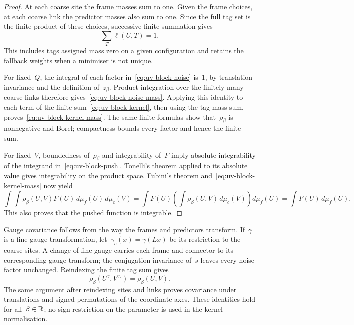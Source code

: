 \begin{proof}
At each coarse site the frame masses sum to one. Given the frame choices, at each coarse link the predictor masses also sum to one. Since the full tag set is the finite product of these choices, successive finite summation gives
\begin{equation*}
 \sum_T\ell(U,T)=1.
\end{equation*}
This includes tags assigned mass zero on a given configuration and retains the fallback weights when a minimiser is not unique.

For fixed~$Q$, the integral of each factor in~\eqref{eq:uv-block-noise} is~$1$, by translation invariance and the definition of~$z_\beta$. Product integration over the finitely many coarse links therefore gives~\eqref{eq:uv-block-noise-mass}. Applying this identity to each term of the finite sum~\eqref{eq:uv-block-kernel}, then using the tag-mass sum, proves~\eqref{eq:uv-block-kernel-mass}. The same finite formulas show that~$\rho_\beta$ is nonnegative and Borel; compactness bounds every factor and hence the finite sum.

For fixed~$V$, boundedness of~$\rho_\beta$ and integrability of~$F$ imply absolute integrability of the integrand in~\eqref{eq:uv-block-push}. Tonelli's theorem applied to its absolute value gives integrability on the product space. Fubini's theorem and~\eqref{eq:uv-block-kernel-mass} now yield
\begin{equation*}
 \int\!\int \rho_\beta(U,V)F(U)\,d\mu_f(U)\,d\mu_c(V)
 =\int F(U)\left(\int\rho_\beta(U,V)\,d\mu_c(V)\right)d\mu_f(U)
 =\int F(U)\,d\mu_f(U).
\end{equation*}
This also proves that the pushed function is integrable.
\end{proof}

Gauge covariance follows from the way the frames and predictors transform. If~$\gamma$ is a fine gauge transformation, let~$\gamma_c(x)=\gamma(Lx)$ be its restriction to the coarse sites. A change of fine gauge carries each frame and connector to its corresponding gauge transform; the conjugation invariance of~$s$ leaves every noise factor unchanged. Reindexing the finite tag sum gives
\begin{equation}\label{eq:uv-block-gauge-covariance}
 \rho_\beta(U^\gamma,V^{\gamma_c})=\rho_\beta(U,V).
\end{equation}
The same argument after reindexing sites and links proves covariance under translations and signed permutations of the coordinate axes. These identities hold for all~$\beta\in\mathbb R$; no sign restriction on the parameter is used in the kernel normalisation.

